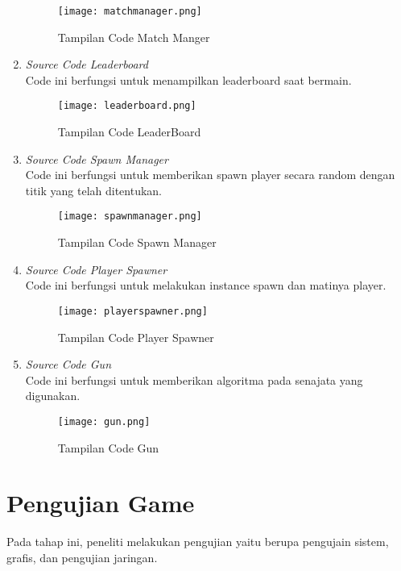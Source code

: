 \begin{enumerate}
    \newpage
    \begin{figure}[h]
        \centering
        \texttt{[image: matchmanager.png]}
        \caption{Tampilan Code Match Manger}
        \label{fig:matchmanager}
    \end{figure}
    \item \textit{Source Code Leaderboard} \\ 
    Code ini berfungsi untuk menampilkan leaderboard saat bermain.
    \begin{figure}[h]
        \centering
        \texttt{[image: leaderboard.png]}
        \caption{Tampilan Code LeaderBoard}
        \label{fig:leaderboard}
    \end{figure}
    \item \textit{Source Code Spawn Manager}\\
    Code ini berfungsi untuk memberikan spawn player secara random dengan titik yang telah ditentukan.
   \newpage
    \begin{figure}[h]
        \centering
        \texttt{[image: spawnmanager.png]}
        \caption{Tampilan Code Spawn Manager}
        \label{fig:spawnmanager}
    \end{figure}
    \item \textit{Source Code Player Spawner} \\ 
    Code ini berfungsi untuk melakukan instance spawn dan matinya player.
    \begin{figure}[h]
        \centering
        \texttt{[image: playerspawner.png]}
        \caption{Tampilan Code Player Spawner}
        \label{fig:playerspawner}
    \end{figure}
    \item \textit{Source Code Gun} \\ 
    Code ini berfungsi untuk memberikan algoritma pada senajata yang digunakan.
    \newpage
    \begin{figure}[h]
        \centering
        \texttt{[image: gun.png]}
        \caption{Tampilan Code Gun}
        \label{fig:gun}
    \end{figure}
\end{enumerate}

\section{Pengujian Game}
\noindent

Pada tahap ini, peneliti melakukan pengujian yaitu berupa pengujain sistem, grafis, dan pengujian jaringan.

